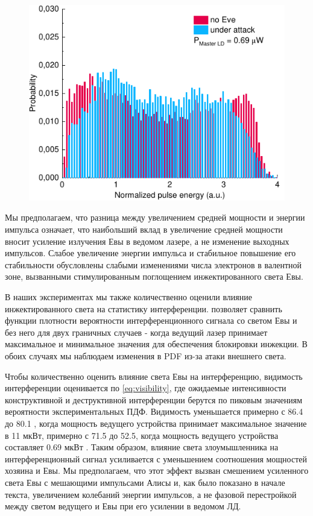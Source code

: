 \begin{figure}
	\includegraphics[width=\textwidth]{images/hist_attack_01.pdf}
	\caption{}
\end{figure}
\label{fig:histogram}

Мы предполагаем, что разница между увеличением средней мощности и энергии импульса означает, что наибольший вклад в увеличение средней мощности вносит усиление излучения Евы в ведомом лазере, а не изменение выходных импульсов. Слабое увеличение энергии импульса и стабильное повышение его стабильности обусловлены слабыми изменениями числа электронов в валентной зоне, вызванными стимулированным поглощением инжектированного света Евы. 

В наших экспериментах мы также количественно оценили влияние инжектированного света на статистику интерференции.  позволяет сравнить функции плотности вероятности интерференционного сигнала со светом Евы и без него для двух граничных случаев - когда ведущий лазер принимает максимальное и минимальное значения для обеспечения блокировки инжекции. В обоих случаях мы наблюдаем изменения в PDF из-за атаки внешнего света.

Чтобы количественно оценить влияние света Евы на интерференцию, видимость интерференции оценивается по \cref{eq:visibility}, где ожидаемые интенсивности конструктивной и деструктивной интерференции берутся по пиковым значениям вероятности экспериментальных ПДФ. Видимость уменьшается примерно с 86.4 до 80.1 , когда мощность ведущего устройства принимает максимальное значение в 11 мкВт, примерно с 71.5 до 52.5, когда мощность ведущего устройства составляет 0.69 мкВт . Таким образом, влияние света злоумышленника на интерференционный сигнал усиливается с уменьшением соотношения мощностей хозяина и Евы. Мы предполагаем, что этот эффект вызван смешением усиленного света Евы с мешающими импульсами Алисы и, как было показано в начале текста, увеличением колебаний энергии импульсов, а не фазовой перестройкой между светом ведущего и Евы при его усилении в ведомом ЛД.
